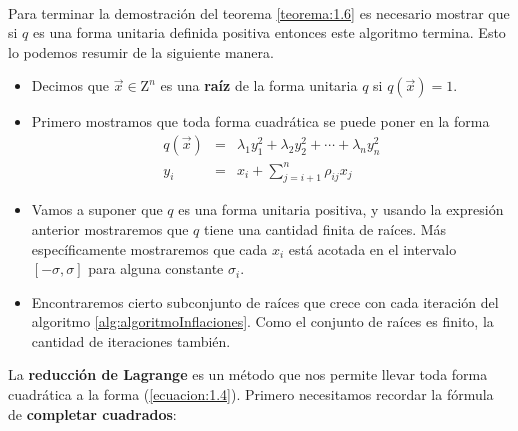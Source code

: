 
\paragraph{}
Para terminar la demostración del teorema \ref{teorema:1.6} es necesario mostrar que si $q$ es una forma unitaria definida positiva entonces este algoritmo termina. Esto lo podemos resumir de la siguiente manera.\\
\begin{itemize}
    \item Decimos que $\overrightarrow{x} \in \mathrm{Z}^{n}$ es una \textbf{raíz} de la forma unitaria $q$ si $q(\overrightarrow{x}) = 1$.
    \item Primero mostramos que toda forma cuadrática se puede poner en la forma
    \begin{eqnarray*}
 q({\overrightarrow{x}}) &  =  & \lambda_{1}y_{1}^{2} + \lambda_{2}y_{2}^{2} + \cdots + \lambda_{n}y_{n}^{2} \\
 y_{i} &  =  & x_{i}+ \sum_{j=i+1}^{n}\rho_{ij}x_{j}
    \end{eqnarray*}
    \item Vamos a suponer que $q$ es una forma unitaria positiva, y usando la expresión anterior mostraremos que $q$ tiene una cantidad finita de raíces. Más específicamente mostraremos que cada $x_{i}$ está acotada en el intervalo $\left[-\sigma, \sigma\right]$ para alguna constante $\sigma_{i}$.
    \item Encontraremos cierto subconjunto de raíces que crece con cada iteración del algoritmo \ref{alg:algoritmoInflaciones}. Como el conjunto de raíces es finito, la cantidad de iteraciones también.
\end{itemize}

La \textbf{reducción de Lagrange} es un método que nos permite llevar toda forma cuadrática a la forma (\ref{ecuacion:1.4}). Primero necesitamos recordar la fórmula de \textbf{completar cuadrados}:

